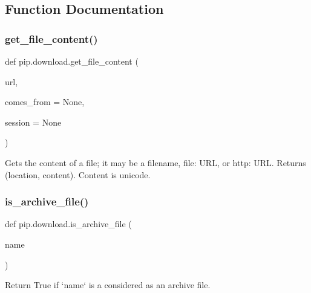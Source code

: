 \subsection{Function Documentation}
\mbox{\label{namespacepip_1_1download_aff76caa03b1aca7c40ca9ba67fe85580}} 
\subsubsection{\texorpdfstring{get\+\_\+file\+\_\+content()}{get\_file\_content()}}
{\footnotesize\ttfamily def pip.\+download.\+get\+\_\+file\+\_\+content (\begin{DoxyParamCaption}\item[{}]{url,  }\item[{}]{comes\+\_\+from = {\ttfamily None},  }\item[{}]{session = {\ttfamily None} }\end{DoxyParamCaption})}

\begin{DoxyVerb}Gets the content of a file; it may be a filename, file: URL, or
http: URL.  Returns (location, content).  Content is unicode.\end{DoxyVerb}
 \mbox{\label{namespacepip_1_1download_a81e68dcf701c507fefeff41b73a93f42}} 
\subsubsection{\texorpdfstring{is\+\_\+archive\+\_\+file()}{is\_archive\_file()}}
{\footnotesize\ttfamily def pip.\+download.\+is\+\_\+archive\+\_\+file (\begin{DoxyParamCaption}\item[{}]{name }\end{DoxyParamCaption})}

\begin{DoxyVerb}Return True if `name` is a considered as an archive file.\end{DoxyVerb}
 \mbox{\label{namespacepip_1_1download_af644adf56a465c06667edaab9ec093a3}} 

